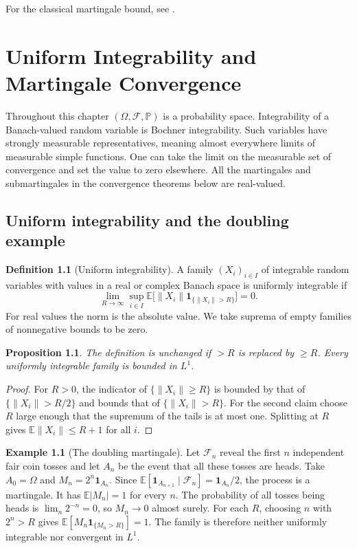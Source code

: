 \documentclass[11pt,oneside,openany]{book}
\theoremstyle{plain}
\newtheorem{proposition}[theorem]{Proposition}
\theoremstyle{definition}
\newtheorem{definition}[theorem]{Definition}
\newtheorem{example}[theorem]{Example}
\theoremstyle{remark}
\begin{document}
For the classical martingale bound, see \cite{Azuma}.
\chapter{Uniform Integrability and Martingale Convergence}

Throughout this chapter \((\Omega,\mathcal F,\mathbb P)\) is a
probability space. Integrability of a Banach-valued random variable is
Bochner integrability. Such variables have strongly measurable
representatives, meaning almost everywhere limits of measurable simple
functions. One can take the limit on the measurable set of convergence
and set the value to zero elsewhere. All the martingales and
submartingales in the convergence theorems below are real-valued.

\section{Uniform integrability and the doubling example}
\label{p207:W30}

\begin{definition}[Uniform integrability]
A family \((X_i)_{i\in I}\) of integrable random variables with values in
a real or complex Banach space is uniformly integrable if
\[
 \lim_{R\to\infty}\sup_{i\in I}
 \mathbb E\big[\lVert X_i\rVert
                \mathbf 1_{\{\lVert X_i\rVert>R\}}\big]=0.
\]
For real values the norm is the absolute value. We take suprema of
empty families of nonnegative bounds to be zero.
\end{definition}

\begin{proposition}
The definition is unchanged if \(>R\) is replaced by \(\ge R\).
Every uniformly integrable family is bounded in \(L^1\).
\end{proposition}

\begin{proof}
For \(R>0\), the indicator of \(\{\lVert X_i\rVert\ge R\}\) is bounded by
that of \(\{\lVert X_i\rVert>R/2\}\) and bounds that of
\(\{\lVert X_i\rVert>R\}\). For the second claim choose \(R\) large
enough that the supremum of the tails is at most one. Splitting at
\(R\) gives \(\mathbb E\lVert X_i\rVert\le R+1\) for all \(i\).
\end{proof}

\begin{example}[The doubling martingale]
Let \(\mathcal F_n\) reveal the first \(n\) independent fair coin tosses
and let \(A_n\) be the event that all these tosses are heads.
Take \(A_0=\Omega\) and \(M_n=2^n\mathbf 1_{A_n}\).
Since
\(\mathbb E[\mathbf 1_{A_{n+1}}\mid\mathcal F_n]
=\mathbf 1_{A_n}/2\), the process is a martingale.
It has \(\mathbb E|M_n|=1\) for every \(n\).
The probability of all tosses being heads is
\(\lim_n2^{-n}=0\), so \(M_n\to0\) almost surely.
For each \(R\), choosing \(n\) with \(2^n>R\) gives
\(\mathbb E[M_n\mathbf 1_{\{M_n>R\}}]=1\).
The family is therefore neither uniformly integrable nor convergent in
\(L^1\).
\end{example}
\end{document}
